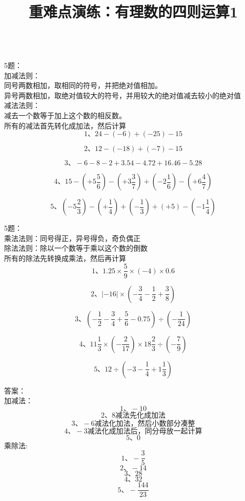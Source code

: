 \documentclass[fleqn]{article}
\title{重难点演练：有理数的四则运算1}
\date{}
\begin{document}
  \hspace{4cm}{\Large 重难点演练：有理数的四则运算1}
  \\
  5题：\\
  加减法则：\\
  同号两数相加，取相同的符号，并把绝对值相加。\\
  异号两数相加，取绝对值较大的符号，并用较大的绝对值减去较小的绝对值\\
  减法法则：\\
  减去一个数等于加上这个数的相反数。\\
  所有的减法首先转化成加法，然后计算\\
	\[\text{1、}24-(-6)+(-25)-15\]

	\[\text{2、}12-(-18)+(-7)-15\]

	\[\text{3、}-6-8-2+3.54-4.72+16.46-5.28\]

	\[\text{4、}15-(+5\frac 56)-(+3\frac 37)+(-2\frac 16)-(+6\frac 47)\]

	\[\text{5、}(-5\frac 23)-(+\frac 14)+(-\frac 13)+(+5)-(-1\frac 14)\]

  5题：\\
  乘法法则：同号得正，异号得负，奇负偶正\\
  除法法则：除以一个数等于乘以这个数的倒数\\
  所有的除法先转换成乘法，然后再计算\\
	\[\text{1、}1.25\times\frac59\times(-4)\times0.6\]

	\[\text{2、}|-16|\times(-\frac34-\frac12+\frac38)\]

	\[\text{3、}(-\frac12-\frac34+\frac56-0.75)\div(-\frac1{24})\]

	\[\text{4、}11\frac13\times(-\frac2{17})\times18\frac23\div(-\frac79)\]

	\[\text{5、}12\div(-3-\frac14+1\frac13)\]

  \newpage
  \noindent 答案：\\
  加减法：\\
	\[\text{1、}-10\]
	\[\text{2、}8\text{减法先化成加法}\]
	\[\text{3、}-6\text{减法化加法，然后小数部分凑整}\]
	\[\text{4、}-3\text{减法化成加法后，同分母放一起计算}\]
	\[\text{5、}0\]
  乘除法:\\
	\[\text{1、}-\frac35\]
	\[\text{2、}-14\]
	\[\text{3、}28\]
	\[\text{4、}32\]
	\[\text{5、}-\frac{144}{23}\]
  
\end{document}
